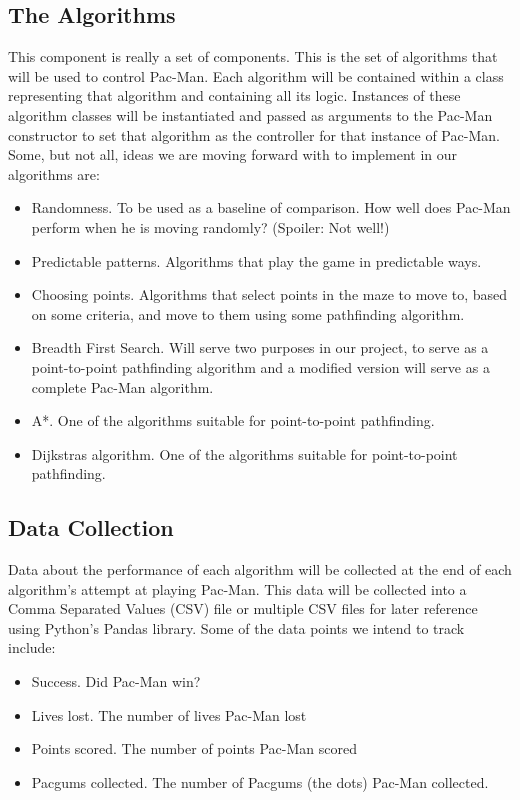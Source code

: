 \documentclass[12pt]{article}
\begin{document}
    \subsection*{The Algorithms}
      This component is really a set of components. This is the set of algorithms that will be used to control Pac-Man. Each algorithm will be contained within a class representing that algorithm and containing all its logic. Instances of these algorithm classes will be instantiated and passed as arguments to the Pac-Man constructor to set that algorithm as the controller for that instance of Pac-Man. Some, but not all, ideas we are moving forward with to implement in our algorithms are:
      \begin{itemize}
        \itemsep-4pt
          \item Randomness. To be used as a baseline of comparison. How well does Pac-Man perform when he is moving randomly? (Spoiler: Not well!)
          \item Predictable patterns. Algorithms that play the game in predictable ways.
          \item Choosing points. Algorithms that select points in the maze to move to, based on some criteria, and move to them using some pathfinding algorithm.
          \item Breadth First Search. Will serve two purposes in our project, to serve as a point-to-point pathfinding algorithm and a modified version will serve as a complete Pac-Man algorithm.
          \item A*. One of the algorithms suitable for point-to-point pathfinding.
          \item Dijkstras algorithm. One of the algorithms suitable for point-to-point pathfinding.
      \end{itemize}
    \subsection*{Data Collection}
      Data about the performance of each algorithm will be collected at the end of each algorithm's attempt at playing Pac-Man. This data will be collected into a Comma Separated Values (CSV) file or multiple CSV files for later reference using Python's Pandas library. Some of the data points we intend to track include:
      \begin{itemize}
        \itemsep-4pt
        \item Success. Did Pac-Man win?
        \item Lives lost. The number of lives Pac-Man lost
        \item Points scored. The number of points Pac-Man scored
        \item Pacgums collected. The number of Pacgums (the dots) Pac-Man collected.
      \end{itemize}
\end{document}
